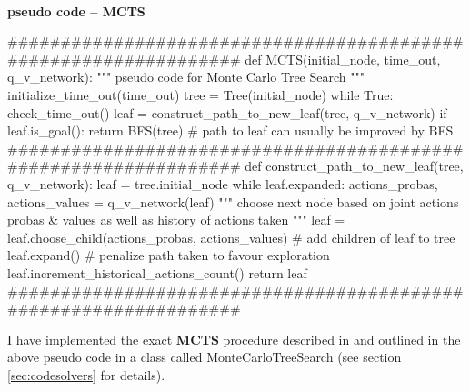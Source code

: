 \paragraph{}{\textbf{pseudo code -- \textbf{MCTS}}}
\begin{pseudocode}
#################################################################
def MCTS(initial_node, time_out, q_v_network):
    """ pseudo code for Monte Carlo Tree Search """
    initialize_time_out(time_out)
    tree = Tree(initial_node)
    while True:
        check_time_out()
        leaf = construct_path_to_new_leaf(tree, q_v_network)
        if leaf.is_goal():
            return BFS(tree) # path to leaf can usually be improved by BFS
#################################################################
def construct_path_to_new_leaf(tree, q_v_network):
    leaf = tree.initial_node
    while leaf.expanded:
        actions_probas, actions_values = q_v_network(leaf)
        """ choose next node based on joint actions probas & values
        as well as history of actions taken
        """
        leaf = leaf.choose_child(actions_probas,
                                 actions_values)
    # add children of leaf to tree
    leaf.expand()
    # penalize path taken to favour exploration
    leaf.increment_historical_actions_count()
    return leaf
#################################################################
\end{pseudocode}
\black

I have implemented the exact \textbf{MCTS} procedure described in \cite{https://doi.org/10.48550/arxiv.1805.07470} and outlined in the above pseudo code in  a class called MonteCarloTreeSearch (see section \ref{sec:codesolvers} for details).




































